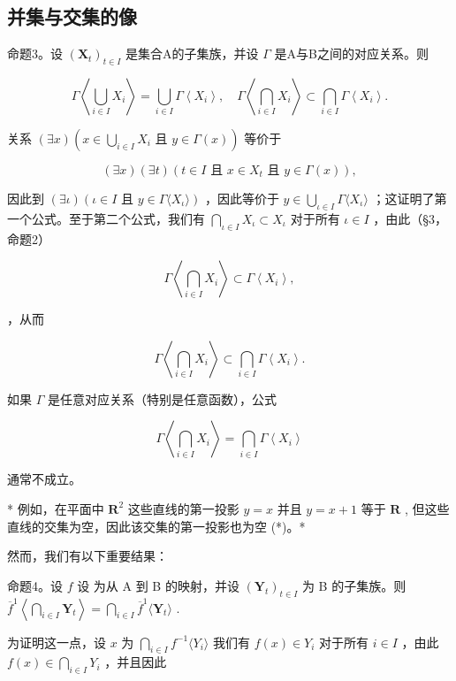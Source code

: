 \subsection{并集与交集的像}

命题3。设 \((\mathbf{X}_t)_{t\in I}\) 是集合A的子集族，并设 \(\Gamma\) 是A与B之间的对应关系。则

\[
\Gamma \left\langle \bigcup_ {i \in I} X _ {i} \right\rangle = \bigcup_ {i \in I} \Gamma \left\langle X _ {i} \right\rangle , \quad \Gamma \left\langle \bigcap_ {i \in I} X _ {i} \right\rangle \subset \bigcap_ {i \in I} \Gamma \left\langle X _ {i} \right\rangle .
\]

关系 \((\exists x)\left(x\in \bigcup_{i\in I}X_i \text{ 且 } y\in \Gamma (x)\right)\) 等价于

\[
(\exists x) (\exists t) (t \in I \text {   且   } x \in X _ {t} \text {   且   } y \in \Gamma (x)),
\]

因此到 \((\exists \iota)(\iota \in I \text{ 且 } y \in \Gamma\langle X_{\iota}\rangle)\) ，因此等价于 \(y \in \bigcup_{\iota \in I} \Gamma\langle X_{\iota}\rangle\) ；这证明了第一个公式。至于第二个公式，我们有 \(\bigcap_{\iota \in I} X_{\iota} \subset X_{\iota}\) 对于所有 \(\iota \in I\) ，由此（§3，命题2）

\[
\Gamma \left\langle \bigcap_ {i \in I} X _ {i} \right\rangle \subset \Gamma \left\langle X _ {i} \right\rangle ,
\]

，从而

\[
\Gamma \left\langle \bigcap_ {i \in I} X _ {i} \right\rangle \subset \bigcap_ {i \in I} \Gamma \left\langle X _ {i} \right\rangle .
\]

如果 \(\Gamma\) 是任意对应关系（特别是任意函数），公式

\[
\Gamma \left\langle \bigcap_ {i \in I} X _ {i} \right\rangle = \bigcap_ {i \in I} \Gamma \left\langle X _ {i} \right\rangle
\]

通常不成立。

* 例如，在平面中 \(\mathbf{R}^2\) 这些直线的第一投影 \(y = x\) 并且 \(y = x + 1\) 等于 \(\mathbf{R}\) , 但这些直线的交集为空，因此该交集的第一投影也为空 (*)。*

然而，我们有以下重要结果：

命题4。设 \(f\) 设 为从 A 到 B 的映射，并设 \((\mathbf{Y}_t)_{t \in I}\) 为 B 的子集族。则 \(\overline{f}^1 \left\langle \bigcap_{i \in I} \mathbf{Y}_t \right\rangle = \bigcap_{i \in I} \overline{f}^1 \langle \mathbf{Y}_t \rangle\) .

为证明这一点，设 \(x\) 为 \(\bigcap_{i \in I} f^{-1} \langle Y_i \rangle\) 我们有 \(f(x) \in Y_i\) 对于所有 \(i \in I\) ，由此 \(f(x) \in \bigcap_{i \in I} Y_i\) ，并且因此

